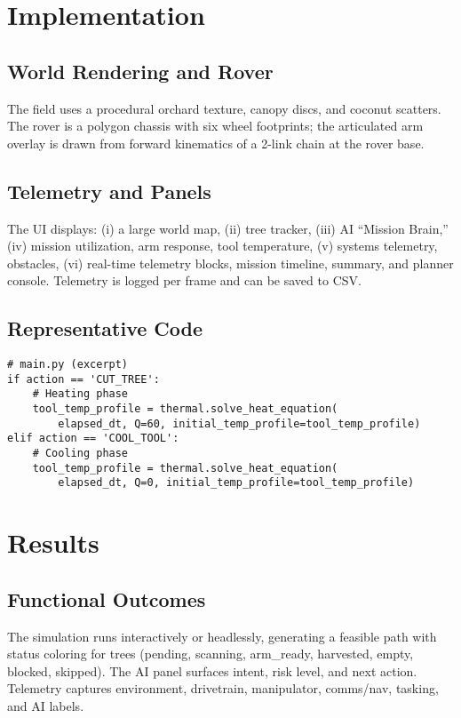 \documentclass[12pt,a4paper]{report}
\begin{document}
\chapter{Implementation}
\section{World Rendering and Rover}
The field uses a procedural orchard texture, canopy discs, and coconut scatters. The rover is a polygon chassis with six wheel footprints; the articulated arm overlay is drawn from forward kinematics of a 2-link chain at the rover base.

\section{Telemetry and Panels}
The UI displays: (i) a large world map, (ii) tree tracker, (iii) AI “Mission Brain,” (iv) mission utilization, arm response, tool temperature, (v) systems telemetry, obstacles, (vi) real-time telemetry blocks, mission timeline, summary, and planner console. Telemetry is logged per frame and can be saved to CSV.

\section{Representative Code}
\begin{lstlisting}[style=code, caption={Thermal update in CUT/COOL actions.}]
# main.py (excerpt)
if action == 'CUT_TREE':
    # Heating phase
    tool_temp_profile = thermal.solve_heat_equation(
        elapsed_dt, Q=60, initial_temp_profile=tool_temp_profile)
elif action == 'COOL_TOOL':
    # Cooling phase
    tool_temp_profile = thermal.solve_heat_equation(
        elapsed_dt, Q=0, initial_temp_profile=tool_temp_profile)
\end{lstlisting}

\chapter{Results}
\section{Functional Outcomes}
The simulation runs interactively or headlessly, generating a feasible path with status coloring for trees (pending, scanning, arm\_ready, harvested, empty, blocked, skipped). The AI panel surfaces intent, risk level, and next action. Telemetry captures environment, drivetrain, manipulator, comms/nav, tasking, and AI labels.
\end{document}
